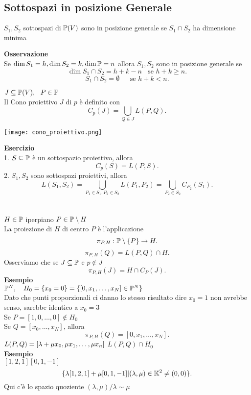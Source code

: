 \documentclass[12px]{article}
\begin{document}
	\subsection{Sottospazi in posizione Generale}
	\begin{defi}
		$S_1, S_2$ sottospazi di $\mathbb{P}(V)$ sono in posizione generale se $S_1\cap S_2$ ha dimensione minima
	\end{defi}
	\textbf{Osservazione}\\
	Se $\dim S_1 = h, \dim S_2 = k, \dim\mathbb{P} =n$ allora $S_1,S_2$ sono in posizione generale se 
	\[
		\dim S_1\cap S_2 = h + k - n \ \ \ \ \text{se } h+k\geq n
	.\]\[
	S_1\cap S_2 = \emptyset \ \ \ \ \ \ \ \text{se } h + k <n
.\]
\begin{defi}
$J\subseteq\mathbb{P}(V), \ \ P\in \mathbb{P}$\\
Il Cono proiettivo  $J$ di $p$ è definito con 
\[
	C_p(J) = \bigcup_{Q\in J}L(P,Q)
.\] 
\end{defi}
\begin{center}
\texttt{[image: cono\_proiettivo.png]}\\
\end{center}
\textbf{Esercizio}\\
1. $S\subseteq\mathbb{P}$ è un sottospazio proiettivo, allora 
\[
 C_p(S) = L(P,S) 
.\] 
2. $S_1, S_2$ sono sottospazi proiettivi, allora 
\[
	L(S_1,S_2) = \bigcup_{P_1\in S_1, P_2\in S_2} L(P_1,P_2) = \bigcup_{P_2\in S_2} C_{P_2}(S_1)
.\] 
\ \\ \hline \ \\
$H\in \mathbb{P}$ iperpiano $P\in \mathbb{P}\setminus H$\\
La proiezione di  $H$ di centro $P$ è l'applicazione
\[
	\pi_{P,H}:\mathbb{P}\setminus\{P\} \rightarrow H
.\] 
\[
	\pi_{P,H}(Q) = L(P,Q) \cap H
.\] 
Osserviamo che se $J\subseteq \mathbb{P}$ e $p\notin J$
 \[
	 \pi_{P,H}(J) = H\cap C_P(J)
.\] 
\textbf{Esempio}\\
$\mathbb{P}^N, \ \ \ H_0 = \{x_0=0\} = \{[0,x_1,\ldots,x_N]\in \mathbb{P}^N\}$\\
Dato che punti proporzionali ci danno lo stesso risultato dire $x_0 = 1$ non avrebbe senso, sarebbe identico a $x_0=3$\\[10px]
Se $P = [1,0,\ldots,0]\notin H_0$\\
Se $Q = [x_0,\ldots,x_N]$, allora
\[
	\pi_{P,H}(Q) = [0,x_1,\ldots,x_N]
.\] 
$L(P,Q) = [ \lambda + \mu x_0, \mu x_1,\ldots, \mu x_n]\\$
$L(P,Q)\cap H_0$\\
\textbf{Esempio}\\
$[1,2,1] [0,1,-1]$\\
\[
	\{ \lambda [1,2,1] + \mu [0,1,-1] | ( \lambda,\mu)\in \mathbb{K}^2 \neq(0,0)\}
.\] 
Qui c'è lo spazio quoziente $( \lambda,\mu) / \lambda \sim \mu $
\ \\ \hline \ \\ 
\end{document}
